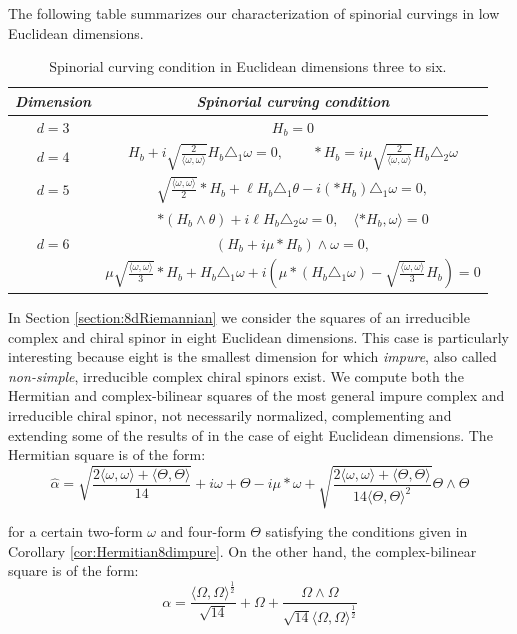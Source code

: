 \documentclass[10pt,a4paper,twoside,reqno]{amsart}
\theoremstyle{plain}
\theoremstyle{definition}
\theoremstyle{remark}
\newcommand{\escal}[1]{\langle#1\rangle}
\begin{document}
\noindent
The following table summarizes our characterization of spinorial curvings in low Euclidean dimensions. 
\begin{table}[!ht]
\centering
\caption{Spinorial curving condition in Euclidean dimensions three to six.}
\label{tab:H_conditions_simple}
\renewcommand{\arraystretch}{2.5} 
\begin{tabular}{|c|c|}
\hline
\emph{Dimension} & \emph{Spinorial curving condition} \\
\hline
$d=3$ & 
$H_b = 0$
\\
\hline
$d=4$ & 
$H_b+i \sqrt{\frac{2}{\escal{\omega,\omega}}}  H_b\triangle_1\omega=0,\qquad \ast H_b = i  \mu \sqrt{\frac{2}{ \escal{\omega,\omega}}} H_b\triangle_2\omega$
\\
\hline
$d=5$ & 
$\sqrt{\frac{\escal{\omega,\omega}}{2}} \ast H_b + \ell H_b\triangle_1\theta-i(*H_b)\triangle_1\omega=0,$\\
&$*(H_b\wedge\theta)+i\ell H_b\triangle_2\omega=0,\quad \escal{*H_b,\omega}=0$
\\
\hline
$d=6$ & 
$(H_b+i\mu \ast H_b )\wedge\omega=0,$\\
&$\mu \sqrt{\frac{\escal{\omega,\omega}}{3}} \ast H_b + H_b\triangle_1\omega+i  ( \mu \ast( H_b\triangle_1\omega) - \sqrt{\frac{\escal{\omega,\omega}}{3}} H_b)=0$
\\
\hline
\end{tabular}
\end{table}

\noindent
In Section \ref{section:8dRiemannian} we consider the squares of an irreducible complex and chiral spinor in eight Euclidean dimensions. This case is particularly interesting because eight is the smallest dimension for which \emph{impure}, also called \emph{non-simple}, irreducible complex chiral spinors exist. We compute both the Hermitian and complex-bilinear squares of the most general impure complex and irreducible chiral spinor, not necessarily normalized, complementing and extending some of the results of \cite{Krasnov2024} in the case of eight Euclidean dimensions. The Hermitian square is of the form:
\begin{equation*}
\widehat{\alpha} = \sqrt{\frac{2\escal{\omega,\omega}+\escal{\Theta,\Theta}}{14}} + i\omega + \Theta-i\mu*\omega +  \sqrt{\frac{2\escal{\omega,\omega}+\escal{\Theta,\Theta}}{14 \escal{\Theta,\Theta}^2 }}\Theta \wedge \Theta
\end{equation*}

\noindent
for a certain two-form $\omega$ and four-form $\Theta$ satisfying the conditions given in Corollary \ref{cor:Hermitian8dimpure}. On the other hand, the complex-bilinear square is of the form:
\begin{equation*}
\alpha =  \frac{\langle \Omega , \Omega \rangle^{\frac{1}{2}}}{\sqrt{14}} + \Omega + \frac{\Omega\wedge\Omega}{\sqrt{14} \langle \Omega , \Omega \rangle^{\frac{1}{2}}}
\end{equation*}
\end{document}
